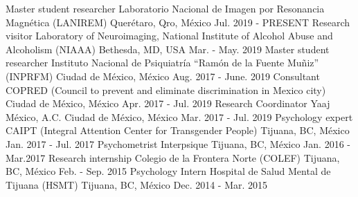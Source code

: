\vspace{-3.2mm}
\vspace{-1.5mm}
\begin{cventries}
    \cventry
        {Master student researcher}
        {Laboratorio Nacional de Imagen por Resonancia Magnética (LANIREM)}
        {Querétaro, Qro, México}
        {Jul. 2019 - PRESENT}
        { }
    \cventry
        {Research visitor}
        {Laboratory of Neuroimaging, National Institute of Alcohol Abuse and
        Alcoholism (NIAAA)}
        {Bethesda, MD, USA}
        {Mar. - May. 2019}
        {
        }
    \cventry
        {Master student researcher}
        {Instituto Nacional de Psiquiatría ``Ramón de la Fuente Muñiz''
        (INPRFM)}
        {Ciudad de México, México}
        {Aug. 2017 - June. 2019}
        {
        }
    \cventry
        {Consultant}
        {COPRED (Council to prevent and eliminate discrimination in Mexico city)}
        {Ciudad de México, México}
        {Apr. 2017 - Jul. 2019}
        {
        }
    \cventry
        {Research Coordinator}
        {Yaaj México, A.C.}
        {Ciudad de México, México}
        {Mar. 2017 - Jul. 2019}
        {
        }
    \cventry
        {Psychology expert}
        {CAIPT (Integral Attention Center for Transgender People)}
        {Tijuana, BC, México}
        {Jan. 2017 - Jul. 2017}
        {
        }
    \cventry
        {Psychometrist}
        {Interpsique}
        {Tijuana, BC, México}
        {Jan. 2016 - Mar.2017}
        {
        }
     \cventry
        {Research internship}
        {Colegio de la Frontera Norte (COLEF)}
        {Tijuana, BC, México}
        {Feb. - Sep. 2015}
        {
        }
    \cventry
        {Psychology Intern}
        {Hospital de Salud Mental de Tijuana (HSMT)}
        {Tijuana, BC, México}
        {Dec. 2014 - Mar. 2015}
        {
        }
\end{cventries}
